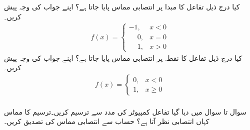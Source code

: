 کیا درج ذیل تفاعل کا مبدا پر انتصابی مماس پایا جاتا ہے؟ اپنے جواب کی وجہ پیش کریں۔
\begin{align*}
f(x)=
\begin{cases}
-1,&x<0\\
\phantom{-}0,&x=0\\
\phantom{-}1,&x>0
\end{cases}
\end{align*}
کیا درج ذیل تفاعل کا نقطہ  پر انتصابی مماس پایا جاتا ہے؟ اپنے جواب کی وجہ پیش کریں۔
\begin{align*}
f(x)=
\begin{cases}
0,&x<0\\
1,&x\ge 0
\end{cases}
\end{align*}
\\
سوال  تا سوال  میں دیا گیا تفاعل کمپیوٹر کی مدد سے  ترسیم کریں۔ترسیم کا مماس کہاں انتصابی نظر آتا ہے؟ حساب سے انتصابی مماس کی تصدیق کریں۔

